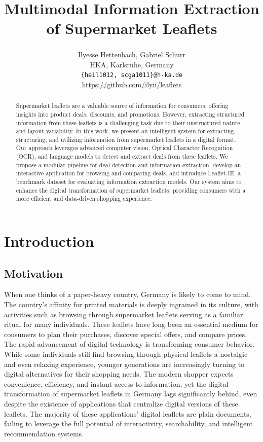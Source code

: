 \documentclass[11pt]{article}
\title{Multimodal Information Extraction of Supermarket Leaflets}
\author{Ilyesse Hettenbach\textsuperscript{}, Gabriel Schurr\textsuperscript{} \\
HKA, Karlsruhe, Germany \\
\texttt{\{heil1012, scga1011\}@h-ka.de} \\
\href{https://github.com/ilyii/leaflets}{https://github.com/ilyii/leaflets}
}
\begin{document}
\maketitle
\begin{abstract}
Supermarket leaflets are a valuable source of information for consumers, offering insights into product deals, discounts, and promotions. However, extracting structured information from these leaflets is a challenging task due to their unstructured nature and layout variability. In this work, we present an intelligent system for extracting, structuring, and utilizing information from supermarket leaflets in a digital format. Our approach leverages advanced computer vision, Optical Character Recognition (OCR), and language models to detect and extract deals from these leaflets. We propose a modular pipeline for deal detection and information extraction, develop an interactive application for browsing and comparing deals, and introduce Leaflet-IE, a benchmark dataset for evaluating information extraction models. Our system aims to enhance the digital transformation of supermarket leaflets, providing consumers with a more efficient and data-driven shopping experience.
\end{abstract}

\section{Introduction}

\subsection{Motivation}
When one thinks of a paper-heavy country, Germany is likely to come to mind. The country's affinity for printed materials is deeply ingrained in its culture, with activities such as browsing through supermarket leaflets serving as a familiar ritual for many individuals. These leaflets have long been an essential medium for consumers to plan their purchases, discover special offers, and compare prices.
The rapid advancement of digital technology is transforming consumer behavior. While some individuals still find browsing through physical leaflets a nostalgic and even relaxing experience, younger generations are increasingly turning to digital alternatives for their shopping needs. The modern shopper expects convenience, efficiency, and instant access to information, yet the digital transformation of supermarket leaflets in Germany lags significantly behind, even despite the existence of applications that centralize digital versions of these leaflets. The majority of these applications' digital leaflets are plain documents, failing to leverage the full potential of interactivity, searchability, and intelligent recommendation systems. 
\end{document}
